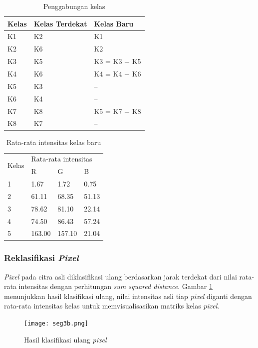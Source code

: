\documentclass[laporan.tex]{subfiles}
\begin{document}
\begin{table}[h]
\centering
\begin{tabular}{|l|l|l|}
\hline
Kelas & Kelas Terdekat & Kelas Baru \\
\hline
K1 & K2 & K1 \\
K2 & K6 & K2 \\
K3 & K5 & K3 = K3 + K5 \\
K4 & K6 & K4 = K4 + K6 \\
K5 & K3 & -- \\
K6 & K4 & -- \\
K7 & K8 & K5 = K7 + K8 \\
K8 & K7 & -- \\
\hline
\end{tabular}
\caption{Penggabungan kelas}
\label{table:newclass}
\end{table}

\begin{table}[h]
\centering
\begin{tabular}{|l|l|l|l|}
\cline{1-4}
\multirow{2}{*}{Kelas} & \multicolumn{3}{l|}{Rata-rata intensitas} \\
\cline{2-4}
 & R & G & B \\
\cline{1-4}
1 & 1.67 & 1.72 & 0.75 \\
2 & 61.11 & 68.35 & 51.13 \\
3 & 78.62 & 81.10 & 22.14 \\
4 & 74.50 & 86.43 & 57.24 \\
5 & 163.00 & 157.10 & 21.04 \\
\cline{1-4}
\end{tabular}
\caption{Rata-rata intensitas kelas baru}
\label{table:newclassavg}
\end{table}

\subsubsection{Reklasifikasi \emph{Pixel}}

\emph{Pixel} pada citra asli diklasifikasi ulang berdasarkan jarak terdekat dari nilai rata-rata intensitas dengan perhitungan \emph{sum squared distance}. Gambar \ref{fig:classfinimg} menunjukkan hasil klasifikasi ulang, nilai intensitas asli tiap \emph{pixel} diganti dengan rata-rata intensitas kelas untuk memvisualisasikan matriks kelas \emph{pixel}.

\begin{figure}[h]
\centering
\texttt{[image: seg3b.png]}
\caption{Hasil klasifikasi ulang \emph{pixel}}
\label{fig:classfinimg}
\end{figure}
\end{document}
